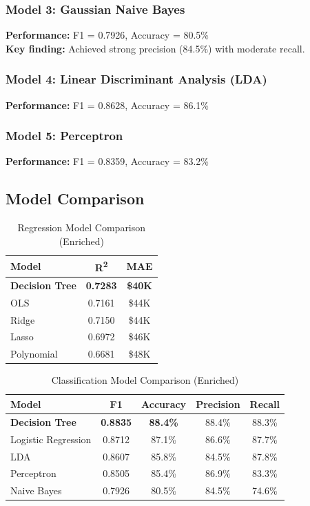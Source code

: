 \documentclass[12pt,a4paper]{article}
\begin{document}
\subsubsection*{Model 3: Gaussian Naive Bayes}
\textbf{Performance:} F1 = 0.7926, Accuracy = 80.5\%\\
\textbf{Key finding:} Achieved strong precision (84.5\%) with moderate recall.

\subsubsection*{Model 4: Linear Discriminant Analysis (LDA)}
\textbf{Performance:} F1 = 0.8628, Accuracy = 86.1\%

\subsubsection*{Model 5: Perceptron}
\textbf{Performance:} F1 = 0.8359, Accuracy = 83.2\%

\subsection{Model Comparison}

\begin{table}[H]
\centering
\caption{Regression Model Comparison (Enriched)}
\begin{tabular}{lcc}
\toprule
\textbf{Model} & \textbf{R\textsuperscript{2}} & \textbf{MAE} \\
\midrule
\textbf{Decision Tree} & \textbf{0.7283} & \textbf{\$40K} \\
OLS & 0.7161 & \$44K \\
Ridge & 0.7150 & \$44K \\
Lasso & 0.6972 & \$46K \\
Polynomial & 0.6681 & \$48K \\
\bottomrule
\end{tabular}
\end{table}

\begin{table}[H]
\centering
\caption{Classification Model Comparison (Enriched)}
\begin{tabular}{lcccc}
\toprule
\textbf{Model} & \textbf{F1} & \textbf{Accuracy} & \textbf{Precision} & \textbf{Recall} \\
\midrule
\textbf{Decision Tree} & \textbf{0.8835} & \textbf{88.4\%} & 88.4\% & 88.3\% \\
Logistic Regression & 0.8712 & 87.1\% & 86.6\% & 87.7\% \\
LDA & 0.8607 & 85.8\% & 84.5\% & 87.8\% \\
Perceptron & 0.8505 & 85.4\% & 86.9\% & 83.3\% \\
Naive Bayes & 0.7926 & 80.5\% & 84.5\% & 74.6\% \\
\bottomrule
\end{tabular}
\end{table}
\end{document}
